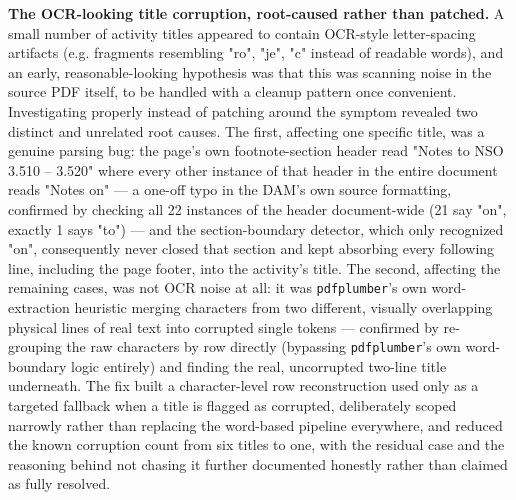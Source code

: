 \textbf{The OCR-looking title corruption, root-caused rather than patched.} A small number of activity titles appeared to contain OCR-style letter-spacing artifacts (e.g. fragments resembling "ro", "je", "c" instead of readable words), and an early, reasonable-looking hypothesis was that this was scanning noise in the source PDF itself, to be handled with a cleanup pattern once convenient. Investigating properly instead of patching around the symptom revealed two distinct and unrelated root causes. The first, affecting one specific title, was a genuine parsing bug: the page's own footnote-section header read "Notes to NSO 3.510 – 3.520" where every other instance of that header in the entire document reads "Notes on" — a one-off typo in the DAM's own source formatting, confirmed by checking all 22 instances of the header document-wide (21 say "on", exactly 1 says "to") — and the section-boundary detector, which only recognized "on", consequently never closed that section and kept absorbing every following line, including the page footer, into the activity's title. The second, affecting the remaining cases, was not OCR noise at all: it was \texttt{pdfplumber}'s own word-extraction heuristic merging characters from two different, visually overlapping physical lines of real text into corrupted single tokens — confirmed by re-grouping the raw characters by row directly (bypassing \texttt{pdfplumber}'s own word-boundary logic entirely) and finding the real, uncorrupted two-line title underneath. The fix built a character-level row reconstruction used only as a targeted fallback when a title is flagged as corrupted, deliberately scoped narrowly rather than replacing the word-based pipeline everywhere, and reduced the known corruption count from six titles to one, with the residual case and the reasoning behind not chasing it further documented honestly rather than claimed as fully resolved.

